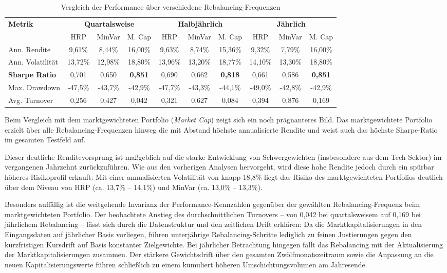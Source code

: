 \documentclass[parskip=half]{scrartcl}
\begin{document}
	\begin{table}[H]
		\centering
		\caption{Vergleich der Performance über verschiedene Rebalancing-Frequenzen}
		\label{tab:performance_vergleich}
		\small
		\begin{tabular}{@{}lccccccccc@{}}
			\toprule
			\textbf{Metrik} & \multicolumn{3}{c}{\textbf{Quartalsweise}} & \multicolumn{3}{c}{\textbf{Halbjährlich}} & \multicolumn{3}{c}{\textbf{Jährlich}} \\ \cmidrule(lr){2-4} \cmidrule(lr){5-7} \cmidrule(lr){8-10}
			& HRP & MinVar & M. Cap & HRP & MinVar & M. Cap & HRP & MinVar & M. Cap \\ \midrule
			Ann. Rendite & 9,61\% & 8,44\% & 16,00\% & 9,63\% & 8,74\% & 15,36\% & 9,32\% & 7,79\% & 16,00\% \\
			Ann. Volatilität & 13,72\% & 12,98\% & 18,80\% & 13,96\% & 13,20\% & 18,77\% & 14,10\% & 13,30\% & 18,80\% \\
			\textbf{Sharpe Ratio} & 0,701 & 0,650 & \textbf{0,851} & 0,690 & 0,662 & \textbf{0,818} & 0,661 & 0,586 & \textbf{0,851} \\
			Max. Drawdown & -47,5\% & -43,7\% & -42,9\% & -47,7\% & -43,3\% & -44,1\% & -49,0\% & -42,8\% & -42,9\% \\
			Avg. Turnover & 0,256 & 0,427 & 0,042 & 0,321 & 0,627 & 0,084 & 0,394 & 0,876 & 0,169 \\ \bottomrule
		\end{tabular}
	\end{table}
	
	Beim Vergleich mit dem marktgewichteten Portfolio (\textit{Market Cap}) zeigt sich ein noch prägnanteres Bild. Das marktgewichtete Portfolio erzielt über alle Rebalancing-Frequenzen hinweg die mit Abstand höchste annualisierte Rendite und weist auch das höchste Sharpe-Ratio im gesamten Testfeld auf. 
	
	Dieser deutliche Renditevorsprung ist maßgeblich auf die starke Entwicklung von Schwergewichten (insbesondere aus dem Tech-Sektor) im vergangenen Jahrzehnt zurückzuführen. Wie aus den vorherigen Analysen hervorgeht, wird diese hohe Rendite jedoch durch ein spürbar höheres Risikoprofil erkauft: Mit einer annualisierten Volatilität von knapp 18,8\% liegt das Risiko des marktgewichteten Portfolios deutlich über dem Niveau von HRP (ca. 13,7\% -- 14,1\%) und MinVar (ca. 13,0\% -- 13,3\%).
	
	Besonders auffällig ist die weitgehende Invarianz der Performance-Kennzahlen gegenüber der gewählten Rebalancing-Frequenz beim marktgewichteten Portfolio. Der beobachtete Anstieg des durchschnittlichen Turnovers – von 0,042 bei quartalsweisem auf 0,169 bei jährlichem Rebalancing – lässt sich durch die Datenstruktur und den zeitlichen Drift erklären: Da die Marktkapitalisierungen in den Eingangsdaten auf jährlicher Basis vorliegen, führen unterjährige Rebalancing-Schritte lediglich zu feinen Justierungen gegen den kurzfristigen Kursdrift auf Basis konstanter Zielgewichte. Bei jährlicher Betrachtung hingegen fällt das Rebalancing mit der Aktualisierung der Marktkapitalisierungen zusammen. Der stärkere Gewichtsdrift über den gesamten Zwölfmonatszeitraum sowie die Anpassung an die neuen Kapitalisierungswerte führen schließlich zu einem kumuliert höheren Umschichtungsvolumen am Jahresende.
	
\end{document}
